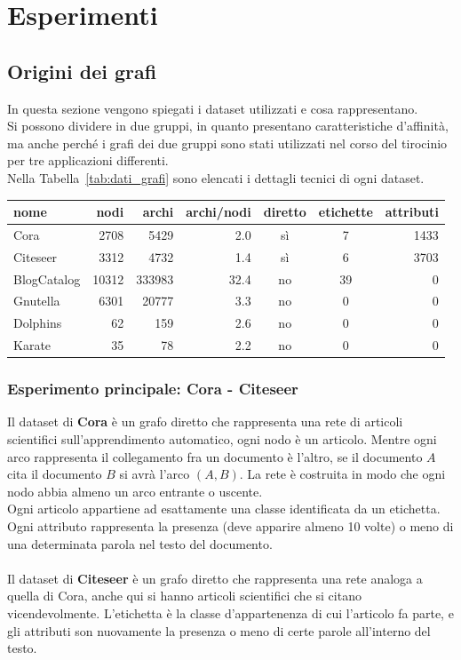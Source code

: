 %
%
\chapter{Esperimenti}
\section{Origini dei grafi}
In questa sezione vengono spiegati i dataset utilizzati e cosa rappresentano.\\
Si possono dividere in due gruppi, in quanto presentano caratteristiche d'affinità, ma anche perché i grafi dei due gruppi sono stati utilizzati nel corso del tirocinio per tre applicazioni differenti.\\
Nella Tabella~\ref{tab:dati_grafi} sono elencati i dettagli tecnici di ogni dataset.
%
\begin{center}
	\begin{tabular}{|l|r|r|r|c|c|r|}
		\hline
		nome&nodi&archi&archi/nodi&diretto&etichette&attributi\\
		\hline
		Cora & 2708 & 5429 & 2.0 & sì & 7 & 1433\\
		Citeseer & 3312 & 4732 & 1.4 & sì & 6 & 3703\\
		\hline
		BlogCatalog & 10312 & 333983 & 32.4 & no & 39 & 0\\
		Gnutella & 6301 & 20777 & 3.3 & no & 0 & 0\\
		Dolphins & 62 & 159 & 2.6 & no & 0 & 0\\
		Karate & 35 & 78 & 2.2 & no & 0 & 0\\
		\hline
		\end{tabular}
		\label{tab:dati_grafi}
\end{center}
%
\subsection*{Esperimento principale: Cora - Citeseer}\cite{Co-Ci_1}\cite{Co-Ci_2}
Il dataset di \textbf{Cora} è un grafo diretto che rappresenta una rete di articoli scientifici sull'apprendimento automatico, ogni nodo è un articolo. Mentre ogni arco rappresenta il collegamento fra un documento è l'altro, se il documento $A$ cita il documento $B$ si avrà l'arco $(A, B)$. La rete è costruita in modo che ogni nodo abbia almeno un arco entrante o uscente.\\
Ogni articolo appartiene ad esattamente una classe identificata da un etichetta. Ogni attributo rappresenta la presenza (deve apparire almeno 10 volte) o meno di una determinata parola nel testo del documento.\\
\\
Il dataset di \textbf{Citeseer} è un grafo diretto che rappresenta una rete analoga a quella di Cora, anche qui si hanno articoli scientifici che si citano vicendevolmente. L'etichetta è la classe d'appartenenza di cui l'articolo fa parte, e gli attributi son nuovamente la presenza o meno di certe parole all'interno del testo.\\
%
